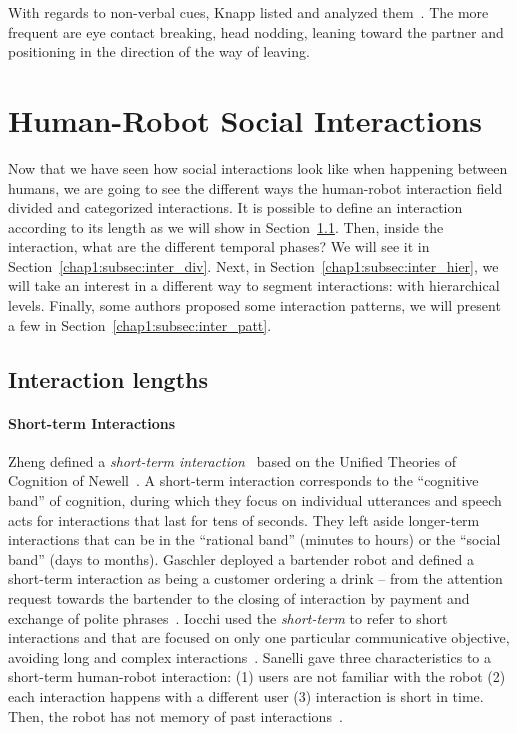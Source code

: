 \documentclass[a4paper,11pt,twoside]{StyleThese}
\begin{document}
With regards to non-verbal cues, Knapp \etal{} listed and analyzed them~\cite{knapp_1973_rhetoric}. The more frequent are eye contact breaking, head nodding, leaning toward the partner and positioning in the direction of the way of leaving.

\section{Human-Robot Social Interactions}\label{chap1:sec:soc_inter}

Now that we have seen how social interactions look like when happening between humans, we are going to see the different ways the human-robot interaction field divided and categorized interactions. It is possible to define an interaction according to its length as we will show in Section~\ref{chap1:subsec:inter_lengths}. Then, inside the interaction, what are the different temporal phases? We will see it in Section~\ref{chap1:subsec:inter_div}. Next, in Section~\ref{chap1:subsec:inter_hier}, we will take an interest in a different way to segment interactions: with hierarchical levels. Finally, some authors proposed some interaction patterns, we will present a few in Section~\ref{chap1:subsec:inter_patt}.

\subsection{Interaction lengths}\label{chap1:subsec:inter_lengths}
\paragraph{Short-term Interactions}
Zheng \etal{} defined a \emph{short-term interaction}~\cite{zheng_2013_designing} based on the Unified Theories of Cognition of Newell~\cite{newell_1994_unified}. A short-term interaction corresponds to the ``cognitive band'' of cognition, during which they focus on individual utterances and speech acts for interactions that last for tens of seconds. They left aside longer-term interactions that can be in the ``rational band'' (minutes to hours) or the ``social band'' (days to months).
Gaschler \etal{} deployed a bartender robot and defined a short-term interaction as being a customer ordering a drink – from the attention request towards the bartender to the closing of interaction by payment and exchange of polite phrases~\cite{gaschler_2012_modelling}.
Iocchi \etal{} used the \emph{short-term} to refer to short interactions and that are focused on only one particular communicative objective, avoiding long and complex interactions~\cite{iocchi_2015_personalized}.
Sanelli \etal{} gave three characteristics to a short-term human-robot interaction: (1) users are not familiar with the robot (2) each interaction happens with a different user (3) interaction is short in time. Then, the robot has not memory of past interactions~\cite{sanelli_2017_short}.
\end{document}
